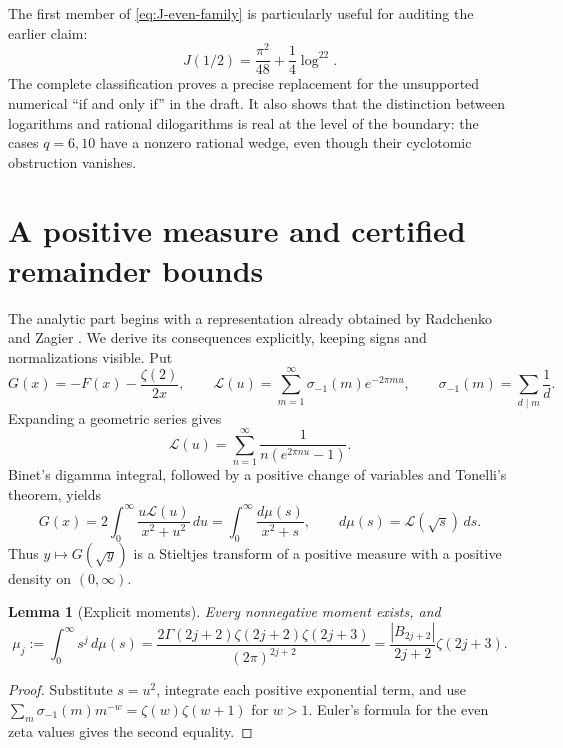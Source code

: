 \documentclass[11pt]{article}
\numberwithin{equation}{section}
\newtheorem{lemma}[theorem]{Lemma}
\theoremstyle{definition}
\theoremstyle{remark}
\newcommand{\Lam}{\mathcal L}
\begin{document}
The first member of \eqref{eq:J-even-family} is particularly useful
for auditing the earlier claim:
\begin{equation}\label{eq:Jhalf}
 J(1/2)=\frac{\pi^2}{48}+\frac14\log^22.
\end{equation}
The complete classification proves a precise replacement for the
unsupported numerical ``if and only if'' in the draft. It also shows
that the distinction between logarithms and rational dilogarithms is
real at the level of the boundary: the cases $q=6,10$ have a nonzero
rational wedge, even though their cyclotomic obstruction vanishes.

\section{A positive measure and certified remainder bounds}
\label{sec:measure}

The analytic part begins with a representation already obtained by
Radchenko and Zagier \cite[\S7.3]{RZ}. We derive its consequences
explicitly, keeping signs and normalizations visible. Put
\begin{equation}\label{eq:G}
 G(x)=-F(x)-\frac{\zeta(2)}{2x},\qquad
 \Lam(u)=\sum_{m=1}^{\infty}\sigma_{-1}(m)e^{-2\pi m u},
 \qquad \sigma_{-1}(m)=\sum_{d\mid m}\frac1d.
\end{equation}
Expanding a geometric series gives
\[
 \Lam(u)=\sum_{n=1}^{\infty}\frac1{n(e^{2\pi n u}-1)}.
\]
Binet's digamma integral, followed by a positive change of variables
and Tonelli's theorem, yields
\begin{equation}\label{eq:Stieltjes}
 G(x)=2\int_0^\infty\frac{u\Lam(u)}{x^2+u^2}\,du
     =\int_0^\infty\frac{d\mu(s)}{x^2+s},
 \qquad d\mu(s)=\Lam(\sqrt{s})\,ds.
\end{equation}
Thus $y\mapsto G(\sqrt y)$ is a Stieltjes transform of a positive
measure with a positive density on $(0,\infty)$.

\begin{lemma}[Explicit moments]\label{lem:moments}
Every nonnegative moment exists, and
\begin{equation}\label{eq:moments}
 \mu_j:=\int_0^\infty s^j\,d\mu(s)
 =\frac{2\Gamma(2j+2)\zeta(2j+2)\zeta(2j+3)}
        {(2\pi)^{2j+2}}
 =\frac{|B_{2j+2}|}{2j+2}\zeta(2j+3).
\end{equation}
\end{lemma}
\begin{proof}
Substitute $s=u^2$, integrate each positive exponential term, and use
$\sum_m\sigma_{-1}(m)m^{-w}=\zeta(w)\zeta(w+1)$ for $w>1$.
Euler's formula for the even zeta values gives the second equality.
\end{proof}
\end{document}
